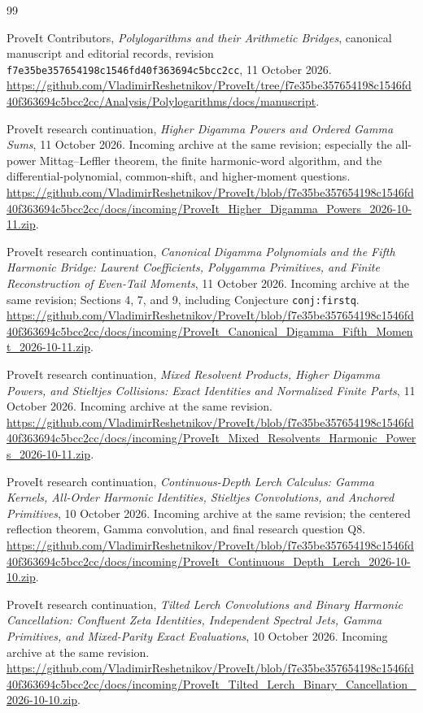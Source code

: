 \documentclass[11pt,a4paper]{article}
\numberwithin{equation}{section}
\theoremstyle{definition}
\theoremstyle{remark}
\newcommand{\sourcecommit}{f7e35be357654198c1546fd40f363694c5bcc2cc}
\begin{document}
\begingroup
\small
\begin{thebibliography}{99}

ProveIt Contributors,
\emph{Polylogarithms and their Arithmetic Bridges},
canonical manuscript and editorial records, revision
\texttt{\sourcecommit}, 11 October 2026.
\url{https://github.com/VladimirReshetnikov/ProveIt/tree/f7e35be357654198c1546fd40f363694c5bcc2cc/Analysis/Polylogarithms/docs/manuscript}.

ProveIt research continuation,
\emph{Higher Digamma Powers and Ordered Gamma Sums}, 11 October 2026.
Incoming archive at the same revision; especially the all-power
Mittag--Leffler theorem, the finite harmonic-word algorithm, and the
differential-polynomial, common-shift, and higher-moment questions.
\url{https://github.com/VladimirReshetnikov/ProveIt/blob/f7e35be357654198c1546fd40f363694c5bcc2cc/docs/incoming/ProveIt_Higher_Digamma_Powers_2026-10-11.zip}.

ProveIt research continuation,
\emph{Canonical Digamma Polynomials and the Fifth Harmonic Bridge:
Laurent Coefficients, Polygamma Primitives, and Finite Reconstruction
of Even-Tail Moments}, 11 October 2026.
Incoming archive at the same revision; Sections 4, 7, and 9,
including Conjecture \texttt{conj:firstq}.
\url{https://github.com/VladimirReshetnikov/ProveIt/blob/f7e35be357654198c1546fd40f363694c5bcc2cc/docs/incoming/ProveIt_Canonical_Digamma_Fifth_Moment_2026-10-11.zip}.

ProveIt research continuation,
\emph{Mixed Resolvent Products, Higher Digamma Powers, and Stieltjes
Collisions: Exact Identities and Normalized Finite Parts},
11 October 2026. Incoming archive at the same revision.
\url{https://github.com/VladimirReshetnikov/ProveIt/blob/f7e35be357654198c1546fd40f363694c5bcc2cc/docs/incoming/ProveIt_Mixed_Resolvents_Harmonic_Powers_2026-10-11.zip}.

ProveIt research continuation,
\emph{Continuous-Depth Lerch Calculus: Gamma Kernels, All-Order Harmonic
Identities, Stieltjes Convolutions, and Anchored Primitives},
10 October 2026. Incoming archive at the same revision; the centered
reflection theorem, Gamma convolution, and final research question Q8.
\url{https://github.com/VladimirReshetnikov/ProveIt/blob/f7e35be357654198c1546fd40f363694c5bcc2cc/docs/incoming/ProveIt_Continuous_Depth_Lerch_2026-10-10.zip}.

ProveIt research continuation,
\emph{Tilted Lerch Convolutions and Binary Harmonic Cancellation:
Confluent Zeta Identities, Independent Spectral Jets, Gamma Primitives,
and Mixed-Parity Exact Evaluations}, 10 October 2026.
Incoming archive at the same revision.
\url{https://github.com/VladimirReshetnikov/ProveIt/blob/f7e35be357654198c1546fd40f363694c5bcc2cc/docs/incoming/ProveIt_Tilted_Lerch_Binary_Cancellation_2026-10-10.zip}.


\end{thebibliography}
\end{document}
